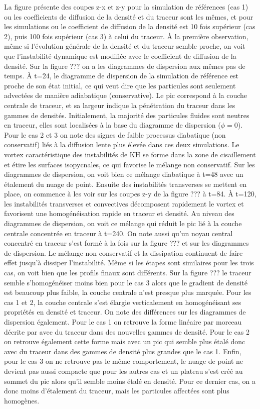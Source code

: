 \documentclass[a4paper,12pt]{article}
\begin{document}
    La figure  présente des coupes z-x et z-y pour la simulation de références (cas 1) ou les coefficients de diffusion de la densité et du traceur sont les mêmes, et pour les simulations ou le coefficient de diffusion de la densité est 10 fois supérieur (cas 2), puis 100 fois supérieur (cas 3) à celui du traceur. À la première observation, même si l'évolution générale de la densité et du traceur semble proche, on voit que l'instabilité dynamique est modifiée avec le coefficient de diffusion de la densité. Sur la figure ??? on a les diagrammes de dispersion aux mêmes pas de temps. À t=24, le diagramme de dispersion de la simulation de référence est proche de son état initial, ce qui veut dire que les particules sont seulement advectées de manière adiabatique (conservative). Le pic correspond à la couche centrale de traceur, et sa largeur indique la pénétration du traceur dans les gammes de densités. Initialement, la majorité des particules fluides sont neutres en traceur, elles sont localisées à la base du diagramme de dispersion ($\phi=0$). Pour le cas 2 et 3 on note des signes de faible processus diabatique (non conservatif) liés à la diffusion lente plus élevée dans ces deux simulations. Le vortex caractéristique des instabilités de KH se forme dans la zone de cisaillement et étire les surfaces isopycnales, ce qui favorise le mélange non conservatif. Sur les diagrammes de dispersion, on voit bien ce mélange diabatique à t=48 avec un étalement du nuage de point. Ensuite des instabilités transverses se mettent en place, on commence à les voir sur les coupes z-y de la figure ??? à t=84. À t=120, les instabilités transverses et convectives décomposent rapidement le vortex et favorisent une homogénéisation rapide en traceur et densité. Au niveau des diagrammes de dispersion, on voit ce mélange qui réduit le pic lié à la couche centrale concentrée en traceur à t=240. On note aussi qu'un noyau central concentré en traceur s'est formé à la fois sur la figure ??? et sur les diagrammes de dispersion. Le mélange non conservatif et la dissipation continuent de faire effet jusqu'à dissiper l'instabilité. Même si les étapes sont similaires pour les trois cas, on voit bien que les profils finaux sont différents. Sur la figure ??? le traceur semble s'homogénéiser moins bien pour le cas 3 alors que le gradient de densité est beaucoup plus faible, la couche centrale n'est presque plus marquée. Pour les cas 1 et 2, la couche centrale s'est élargie verticalement en homogénéisant ses propriétés en densité et traceur. On note des différences sur les diagrammes de dispersion également. Pour le cas 1 on retrouve la forme linéaire par morceau décrite par \cite{penney_diapycnal_2020} avec du traceur dans des nouvelles gammes de densité. Pour le cas 2 on retrouve également cette forme mais avec un pic qui semble plus étalé donc avec du traceur dans des gammes de densité plus grandes que le cas 1. Enfin, pour le cas 3 on ne retrouve pas le même comportement, le nuage de point ne devient pas aussi compacte que pour les autres cas et un plateau s'est créé au sommet du pic alors qu'il semble moins étalé en densité. Pour ce dernier cas, on a donc moins d'étalement du traceur, mais les particules affectées sont plus homogènes.
    
\end{document}
